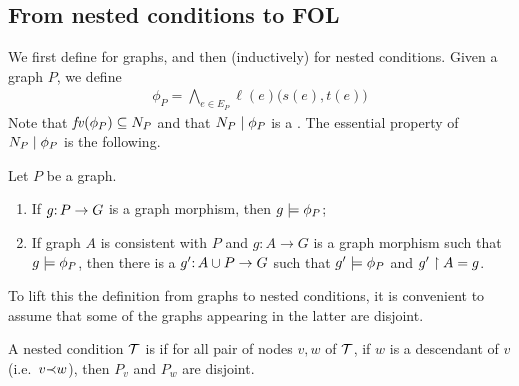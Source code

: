 \subsection{From nested conditions to FOL}

We first define {\cfors} for graphs, and then (inductively) for nested conditions. Given a graph $P$, we define
\begin{align}
	\phi_P = \textstyle
 \bigwedge_{e\in E_P} \ell(e)\bigl(s(e),t(e)\bigr)\label{eq:phiP}
\end{align}
%
Note that $\mathit{fv}(\phi_P)\subseteq N_P$ and that ${N_P} \mid {\phi_P}$ is a {\cfor}. The essential property of ${N_P} \mid {\phi_P}$ is the following.
%
\begin{proposition}\label{prop:graph formula}
Let $P$ be a graph.
\begin{enumerate}
\item If $g{:}\, P\rightarrow G$ is a graph morphism, then $g\models \phi_P$;
\item If graph $A$ is consistent with $P$ and $g:A\to G$ is a graph morphism such that $g\models \phi_P$, then there is a $g'{:}\, A \cup P \rightarrow G$ such that $g' \models \phi_P$ and $g' \restriction A = g$.
\end{enumerate}
\end{proposition}
%

To lift this the definition from graphs to nested conditions, it is convenient to assume that some of the graphs appearing in the latter are disjoint. 

\begin{definition}
	A nested condition ${\mathcal{T}}$ is \emph{\proper} if for all pair of nodes $v, w$ of ${\mathcal{T}}$, if $w$ is a descendant of $v$ (i.e.\ $v {\prec} w$), then $P_v$ and $P_w$ 
	are disjoint. 
\end{definition}


